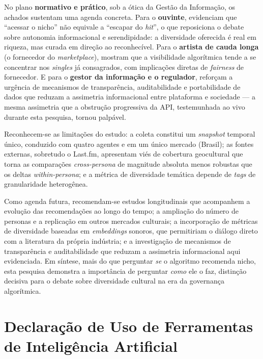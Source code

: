 \documentclass[12pt, %
openright,
oneside, %
a4paper,    %
english,   %
brazil]{facom-ufu-abntex2}
\begin{document}
No plano \textbf{normativo e prático}, sob a ótica da Gestão da Informação, os
achados sustentam uma agenda concreta. Para o \textbf{ouvinte}, evidenciam que
``acessar o nicho'' não equivale a ``escapar do \emph{hit}'', o que reposiciona o
debate sobre autonomia informacional e serendipidade: a diversidade oferecida é
real em riqueza, mas curada em direção ao reconhecível. Para o \textbf{artista de
cauda longa} (o fornecedor do \emph{marketplace}), mostram que a visibilidade
algorítmica tende a se concentrar nos \emph{singles} já consagrados, com
implicações diretas de \emph{fairness} de fornecedor. E para o \textbf{gestor da
informação e o regulador}, reforçam a urgência de mecanismos de transparência,
auditabilidade e portabilidade de dados que reduzam a assimetria informacional
entre plataforma e sociedade --- a mesma assimetria que a obstrução progressiva
da API, testemunhada ao vivo durante esta pesquisa, tornou palpável.

Reconhecem-se as limitações do estudo: a coleta constitui um \emph{snapshot}
temporal único, conduzido com quatro agentes e em um único mercado (Brasil); as
fontes externas, sobretudo o Last.fm, apresentam viés de cobertura geocultural
que torna as comparações \emph{cross-persona} de magnitude absoluta menos
robustas que os deltas \emph{within-persona}; e a métrica de diversidade temática
depende de \emph{tags} de granularidade heterogênea.

Como agenda futura, recomendam-se estudos longitudinais que acompanhem a evolução
das recomendações ao longo do tempo; a ampliação do número de personas e a
replicação em outros mercados culturais; a incorporação de métricas de
diversidade baseadas em \emph{embeddings} sonoros, que permitiriam o diálogo
direto com a literatura da própria indústria; e a investigação de mecanismos de
transparência e auditabilidade que reduzam a assimetria informacional aqui
evidenciada. Em síntese, mais do que perguntar \emph{se} o algoritmo recomenda
nicho, esta pesquisa demonstra a importância de perguntar \emph{como} ele o faz,
distinção decisiva para o debate sobre diversidade cultural na era da
governança algorítmica.

\chapter*{Declaração de Uso de Ferramentas de Inteligência Artificial}
\end{document}
